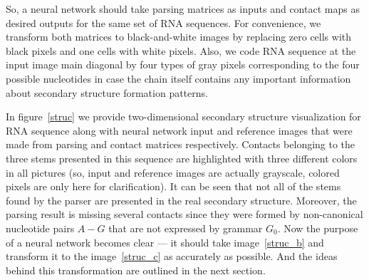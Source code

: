So, a neural network should take parsing matrices as inputs and contact maps as desired outputs for the same set of RNA sequences. For convenience, we transform both matrices to black-and-white images by replacing zero cells with black pixels and one cells with white pixels. Also, we code RNA sequence at the input image main diagonal by four types of gray pixels corresponding to the four possible nucleotides in case the chain itself contains any important information about secondary structure formation patterns.

In figure~\ref{struc} we provide two-dimensional secondary structure visualization for RNA sequence along with neural network input and reference images that were made from parsing and contact matrices respectively. Contacts belonging to the three stems presented in this sequence are highlighted with three different colors in all pictures (so, input and reference images are actually grayscale, colored pixels are only here for clarification). It can be seen that not all of the stems found by the parser are presented in the real secondary structure. Moreover, the parsing result is missing several contacts since they were formed by non-canonical nucleotide pairs $A-G$ that are not expressed by grammar $G_0$. Now the purpose of a neural network becomes clear --- it should take image~\ref{struc_b} and transform it to the image~\ref{struc_c} as accurately as possible. And the ideas behind this transformation are outlined in the next section.

